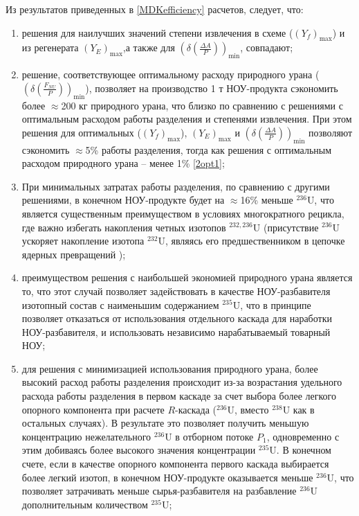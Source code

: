 Из результатов приведенных в \ref{MDKefficiency} расчетов, следует, что:
\begin{enumerate}
    \item решения для наилучших значений степени извлечения в схеме ($(Y_{f})_\text{max}$) и из регенерата $(Y_{E})_\text{max}$,а также для $(\delta(\frac{\Delta A}{P}))_\text{min}$, совпадают;
    \item решение, соответствующее оптимальному расходу природного урана ($(\delta(\frac{F_{NU}}{P}))_\text{min}$), позволяет на производство 1 т НОУ-продукта сэкономить более $\approx$200 кг природного урана, что близко по сравнению с решениями с оптимальным расходом работы разделения и степенями извлечения. При этом решения для оптимальных ($(Y_{f})_\text{max}$), $(Y_{E})_\text{max}$ и $(\delta(\frac{\Delta A}{P}))_\text{min}$ позволяют сэкономить $\approx$5\% работы разделения, тогда как решения с оптимальным расходом природного урана -- менее 1\% \ref{2opt1};
    \item При минимальных затратах работы разделения, по сравнению с другими решениями, в конечном НОУ-продукте будет на $\approx$16\% меньше $^{236}$U, что является существенным преимуществом в условиях многократного рецикла, где важно избегать накопления четных изотопов $^{232,236}$U (присутствие $^{236}$U ускоряет накопление изотопа $^{232}$U, являясь его предшественником в цепочке ядерных превращений \cite{smirnovEvolutionIsotopicComposition2012});
    \item преимуществом решения с наибольшей экономией природного урана является то, что этот случай позволяет задействовать в качестве НОУ-разбавителя изотопный состав с наименьшим содержанием $^{235}$U, что в принципе позволяет отказаться от использования отдельного каскада для наработки НОУ-разбавителя, и использовать независимо нарабатываемый товарный НОУ;
    \item для решения с минимизацией использования природного урана, более высокий расход работы разделения происходит из-за возрастания удельного расхода работы разделения в первом каскаде за счет выбора более легкого опорного компонента при расчете $R$-каскада ($^{236}$U, вместо $^{238}$U как в остальных случаях). В результате это позволяет получить меньшую концентрацию нежелательного $^{236}$U в отборном потоке $P_{1}$, одновременно с этим добиваясь более высокого значения концентрации $^{235}$U. В конечном счете, если в качестве опорного компонента первого каскада выбирается более легкий изотоп, в конечном НОУ-продукте оказывается меньше $^{236}$U, что позволяет затрачивать меньше сырья-разбавителя на разбавление $^{236}$U дополнительным количеством $^{235}$U;

\end{enumerate}
